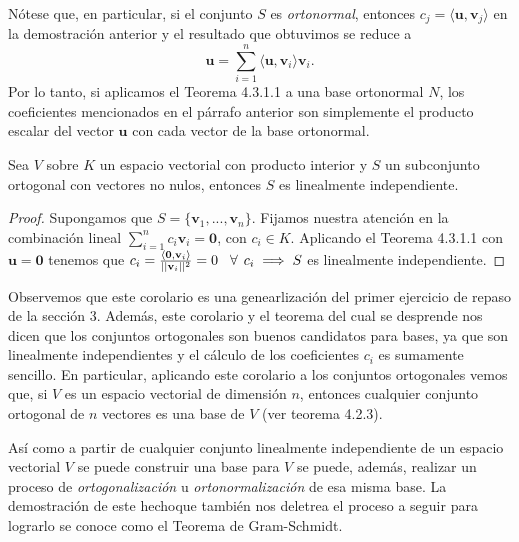\documentclass[12pt,dvipsnames]{article}
\newenvironment{teorema}[2][Teorema]{\begin{trivlist}
\item[\hskip \labelsep {\bfseries #1}\hskip \labelsep {\bfseries #2.}]}{\end{trivlist}}
\newenvironment{corolario}[2][Corolario]{\begin{trivlist}
\item[\hskip \labelsep {\bfseries #1}\hskip \labelsep {\bfseries #2.}]}{\end{trivlist}}
\begin{document}
\begin{teorema} {4.3.1.1}
    Nótese que, en particular, si el conjunto $S$ es \emph{ortonormal}, entonces $c_j=\langle\mathbf{u},\mathbf{v}_j\rangle$ en la demostración anterior y el resultado que obtuvimos se reduce a \[
        \mathbf{u} = \sum_{i=1}^n \langle\mathbf{u},\mathbf{v}_i\rangle\mathbf{v}_i
    .\] \noindent Por lo tanto, si aplicamos el Teorema 4.3.1.1 a una base ortonormal $N$, los coeficientes mencionados en el párrafo anterior son simplemente el producto escalar del vector $\mathbf{u}$ con cada vector de la base ortonormal.

\end{teorema}

\begin{corolario} {4.3.1.2}
Sea $V$ sobre $K$ un espacio vectorial con producto interior y $S$ un subconjunto ortogonal con vectores no nulos, entonces $S$ es linealmente independiente.

\begin{proof}
    Supongamos que $S=\{\mathbf{v}_1, ..., \mathbf{v}_n\}.$ Fijamos nuestra atención en la combinación lineal $\sum_{i=1}^n c_i\mathbf{v}_i=\mathbf{0}$, con $c_i\in K$. Aplicando el Teorema 4.3.1.1 con $\mathbf{u}=\mathbf{0}$ tenemos que $c_i=\frac{\langle\mathbf{0},\mathbf{v}_i\rangle}{||\mathbf{v}_i||^2}=0\hspace{3mm}\forall\hspace{1.5mm}  c_i\implies S$ es linealmente independiente.
\end{proof}

Observemos que este corolario es una genearlización del primer ejercicio de repaso de la sección 3. Además, este corolario y el teorema del cual se desprende nos dicen que los conjuntos ortogonales son buenos candidatos para bases, ya que son linealmente independientes y el cálculo de los coeficientes $c_i$ es sumamente sencillo. En particular, aplicando este corolario a los conjuntos ortogonales vemos que, si $V$ es un espacio vectorial de dimensión $n$, entonces cualquier conjunto ortogonal de $n$ vectores es una base de $V$ (ver teorema 4.2.3). 
\end{corolario}

Así como a partir de cualquier conjunto linealmente independiente de un espacio vectorial $V$ se puede construir una base para $V$ se puede, además, realizar un proceso de \emph{ortogonalización} u \emph{ortonormalización} de esa misma base. La demostración de este hecho\textemdash que también nos deletrea el proceso a seguir para lograrlo\textemdash \hspace{0.5mm} se conoce como el Teorema de Gram-Schmidt.
\end{document}
